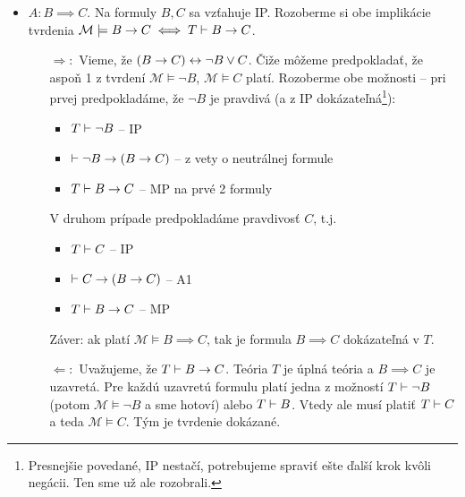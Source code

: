 \begin{dokaz}
\begin{itemize}
\begin{itemize}
        \item $A: B \implies C$. Na formuly $B,C$ sa vzťahuje IP.
            Rozoberme si obe implikácie tvrdenia
            $\mathcal{M} \models B \rightarrow C \iff
             T \vdash B \rightarrow C$.
            \begin{itemize}
            \item[$\Rightarrow:$] Vieme, že $(B \rightarrow C)
                    \leftrightarrow \neg B \lor C$. Čiže môžeme
                    predpokladať, že aspoň 1 z tvrdení 
                    $\mathcal{M} \models \neg B$,
                    $\mathcal{M} \models C$ platí. Rozoberme obe
                    možnosti -- pri prvej predpokladáme, že $\neg B$ je
                    pravdivá (a z IP dokázateľná\footnote{
                        Presnejšie povedané, IP nestačí, potrebujeme
                        spraviť ešte ďalší krok kvôli negácii.
                        Ten sme už ale rozobrali.}):
                    \begin{itemize}
                    \item $T \vdash \neg B$ -- IP
                    \item $\vdash \neg B \rightarrow (B \rightarrow C)$ --
                        z vety o neutrálnej formule
                    \item $T \vdash B \rightarrow C$ -- MP na prvé 2
                        formuly
                    \end{itemize}
                    V druhom prípade predpokladáme pravdivosť $C$,
                    t.j.
                    \begin{itemize}
                    \item $T \vdash C$ -- IP
                    \item $\vdash C \rightarrow (B \rightarrow C)$ -- A1
                    \item $T \vdash B \rightarrow C$ -- MP
                    \end{itemize}
                    Záver: ak platí
                    $\mathcal{M} \models B \implies C$, tak je formula
                    $B \implies C$ dokázateľná v $T$.
            \smallskip
            \item[$\Leftarrow:$] Uvažujeme, že
                $T \vdash B \rightarrow C$.
                Teória $T$ je úplná teória a $B \implies C$ je uzavretá.
                Pre každú uzavretú formulu platí jedna z možností
                $T \vdash \neg B$ (potom $\mathcal{M} \models \neg B$ a sme
                hotoví) alebo $T \vdash B$.
                Vtedy ale musí platiť $T \vdash C$
                a teda $\mathcal{M} \models C$. Tým je tvrdenie dokázané.


\end{itemize}
\end{itemize}
\end{itemize}
\end{dokaz}
